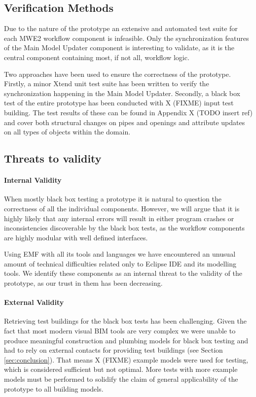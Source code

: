 \subsection{Verification Methods}
\label{subsec:verification_methods}
Due to the nature of the prototype an extensive and automated test suite for each MWE2 workflow component is infeasible. Only the synchronization features of the Main Model Updater component is interesting to validate, as it is the central component containing most, if not all, workflow logic.

Two approaches have been used to ensure the correctness of the prototype. Firstly, a minor Xtend unit test suite has been written to verify the synchronization happening in the Main Model Updater. Secondly, a black box test of the entire prototype has been conducted with X (FIXME) input test building. The test results of these can be found in Appendix X (TODO insert ref) and cover both structural changes on pipes and openings and attribute updates on all types of objects within the domain.

\subsection{Threats to validity}
\paragraph{Internal Validity} When mostly black box testing a prototype it is natural to question the correctness of all the individual components. However, we will argue that it is highly likely that any internal errors will result in either program crashes or inconsistencies discoverable by the black box tests, as the workflow components are highly modular with well defined interfaces.

Using EMF with all its tools and languages we have encountered an unusual amount of technical difficulties related only to Eclipse IDE and its modelling tools. We identify these components as an internal threat to the validity of the prototype, as our trust in them has been decreasing.

\paragraph{External Validity} Retrieving test buildings for the black box tests has been challenging. Given the fact that most modern visual BIM tools are very complex we were unable to produce meaningful construction and plumbing models for black box testing and had to rely on external contacts for providing test buildings (see Section \ref{sec:conclusion}). That means X (FIXME) example models were used for testing, which is considered sufficient but not optimal. More tests with more example models must be performed to solidify the claim of general applicability of the prototype to all building models.

